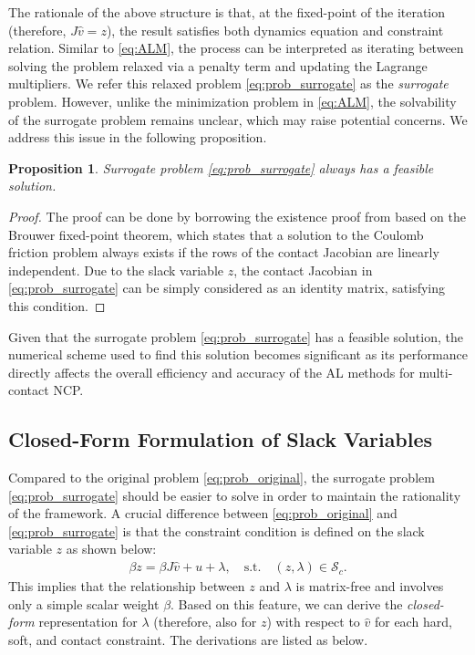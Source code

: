 \documentclass[lettersize,journal]{IEEEtran}
\newtheorem{proposition}{Proposition}
\begin{document}
The rationale of the above structure is that, at the fixed-point of the iteration (therefore, $J\hat{v}=z$), the result satisfies both dynamics equation and constraint relation.
Similar to \eqref{eq:ALM}, the process can be interpreted as iterating between solving the problem relaxed via a penalty term and updating the Lagrange multipliers. 
We refer this relaxed problem \eqref{eq:prob_surrogate} as the \textit{surrogate} problem.
However, unlike the minimization problem in \eqref{eq:ALM}, the solvability of the surrogate problem remains unclear, which may raise potential concerns. We address this issue in the following proposition.
\begin{proposition} \label{prop:surrogate_feasibility}
Surrogate problem \eqref{eq:prob_surrogate} always has a feasible solution. 
\end{proposition}
\begin{proof}
    The proof can be done by borrowing the existence proof from \cite{acary2011formulation} based on the Brouwer fixed-point theorem, which states that a solution to the Coulomb friction problem always exists if the rows of the contact Jacobian are linearly independent. Due to the slack variable $z$, the contact Jacobian in \eqref{eq:prob_surrogate} can be simply considered as an identity matrix, satisfying this condition.
\end{proof}

Given that the surrogate problem \eqref{eq:prob_surrogate} has a feasible solution, the numerical scheme used to find this solution becomes significant as its performance directly affects the overall efficiency and accuracy of the AL methods for multi-contact NCP.


\subsection{Closed-Form Formulation of Slack Variables}
\label{subsec:closed_form_slack}

Compared to the original problem \eqref{eq:prob_original}, the surrogate problem \eqref{eq:prob_surrogate} should be easier to solve in order to maintain the rationality of the framework. 
A crucial difference between \eqref{eq:prob_original} and \eqref{eq:prob_surrogate} is that the constraint condition is defined on the slack variable $z$ as shown below:
\begin{align} \label{eq:rel_z_lambda}
\beta z = \beta J\hat{v} + u + \lambda, \quad \text{s.t.} \quad (z,\lambda) \in \mathcal{S}_c.
\end{align}
This implies that the relationship between $z$ and $\lambda$ is matrix-free and involves only a simple scalar weight $\beta$.
Based on this feature, we can derive the \textit{closed-form} representation for $\lambda$ (therefore, also for $z$) with respect to $\hat{v}$ for each hard, soft, and contact constraint. 
The derivations are listed as below.
\end{document}
